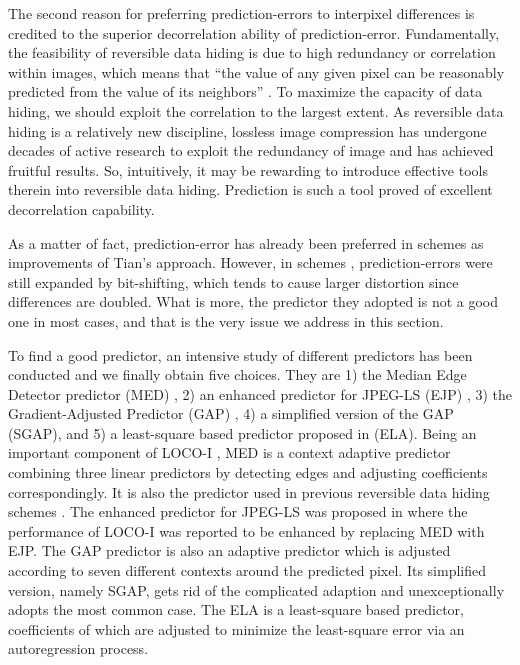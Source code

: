 \documentclass{sig-alternate}
\begin{document}
The second reason for preferring prediction-errors to interpixel differences is credited to the
superior decorrelation ability of prediction-error. Fundamentally, the feasibility of reversible
data hiding is due to high redundancy or correlation within images, which means that ``the value of
any given pixel can be reasonably predicted from the value of its neighbors'' \cite{Gonzalez02dip}.
To maximize the capacity of data hiding, we should exploit the correlation to the largest extent. As
reversible data hiding is a relatively new discipline, lossless image compression has undergone
decades of active research to exploit the redundancy of image and has achieved fruitful results. So,
intuitively, it may be rewarding to introduce effective tools therein into reversible data hiding.
Prediction is such a tool proved of excellent decorrelation capability.

As a matter of fact, prediction-error has already been preferred in schemes
\cite{Thodi07pee,Kuribayashi08,Hu2009} as improvements of Tian's approach. However, in schemes
\cite{Thodi07pee,Kuribayashi08,Hu2009}, prediction-errors were still expanded by bit-shifting, which
tends to cause larger distortion since differences are doubled. What is more, the predictor they
adopted is not a good one in most cases, and that is the very issue we address in this section.

To find a good predictor, an intensive study of different predictors has been conducted and we
finally obtain five choices. They are 1) the Median Edge Detector predictor (MED) \cite{Loco00ip},
2) an enhanced predictor for JPEG-LS (EJP) \cite{Enhancedjpegls}, 3) the Gradient-Adjusted Predictor
(GAP) \cite{Wu97calic2}, 4) a simplified version of the GAP (SGAP), and 5) a least-square based
predictor proposed in \cite{Kau05lsap} (ELA). Being an important component of LOCO-I
\cite{Loco00ip}, MED is a context adaptive predictor combining three linear predictors by detecting
edges and adjusting coefficients correspondingly. It is also the predictor used in previous
reversible data hiding schemes \cite{Thodi07pee,Kuribayashi08,Hu2009}. The enhanced predictor for
JPEG-LS was proposed in \cite{Enhancedjpegls} where the performance of LOCO-I was reported to be
enhanced by replacing MED with EJP. The GAP predictor is also an adaptive predictor which is
adjusted according to seven different contexts around the predicted pixel. Its simplified version,
namely SGAP, gets rid of the complicated adaption and unexceptionally adopts the most common case.
The ELA is a least-square based predictor, coefficients of which are adjusted to minimize the
least-square error via an autoregression process.
\end{document}
